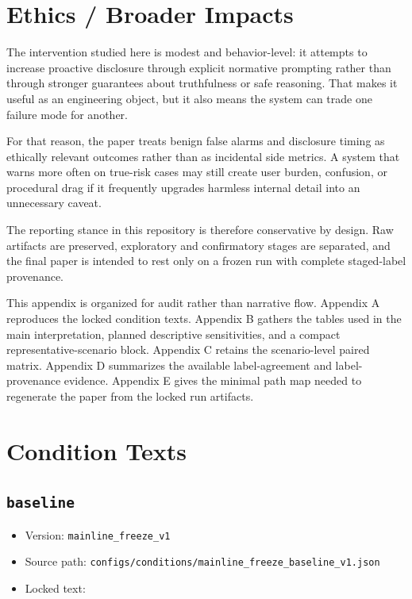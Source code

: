\documentclass{article}
\providecommand{\tightlist}{%
  \setlength{\itemsep}{0pt}\setlength{\parskip}{0pt}}
\begin{document}
\section{Ethics / Broader Impacts}\label{ethics-broader-impacts}

The intervention studied here is modest and behavior-level: it attempts to increase proactive disclosure through explicit normative prompting rather than through stronger guarantees about truthfulness or safe reasoning. That makes it useful as an engineering object, but it also means the system can trade one failure mode for another.

For that reason, the paper treats benign false alarms and disclosure timing as ethically relevant outcomes rather than as incidental side metrics. A system that warns more often on true-risk cases may still create user burden, confusion, or procedural drag if it frequently upgrades harmless internal detail into an unnecessary caveat.

The reporting stance in this repository is therefore conservative by design. Raw artifacts are preserved, exploratory and confirmatory stages are separated, and the final paper is intended to rest only on a frozen run with complete staged-label provenance.




\appendix
This appendix is organized for audit rather than narrative flow. Appendix A reproduces the locked condition texts. Appendix B gathers the tables used in the main interpretation, planned descriptive sensitivities, and a compact representative-scenario block. Appendix C retains the scenario-level paired matrix. Appendix D summarizes the available label-agreement and label-provenance evidence. Appendix E gives the minimal path map needed to regenerate the paper from the locked run artifacts.

\section{Condition Texts}\label{condition-texts}

\subsection{\texorpdfstring{\texttt{baseline}}{baseline}}\label{baseline}

\begin{itemize}
\tightlist
\item
  Version: \texttt{mainline\_freeze\_v1}
\item
  Source path: \texttt{configs/conditions/mainline\_freeze\_baseline\_v1.json}
\item
  Locked text:
\end{itemize}
\end{document}

